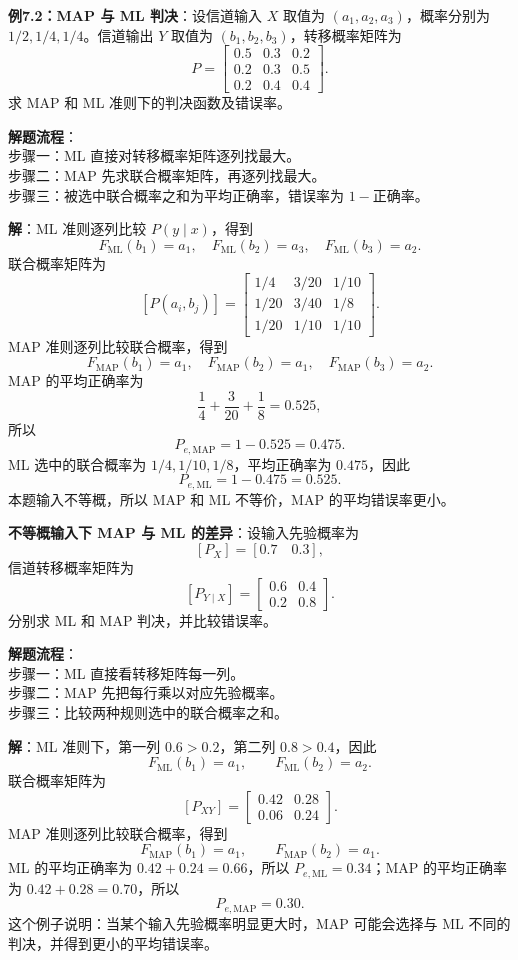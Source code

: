 \begin{example}
\label{ex:ch7-map-ml-decision}
\textbf{例7.2：MAP 与 ML 判决}：设信道输入 $X$ 取值为 $(a_1,a_2,a_3)$，概率分别为 $1/2,1/4,1/4$。信道输出 $Y$ 取值为 $(b_1,b_2,b_3)$，转移概率矩阵为
\[
P=
\begin{bmatrix}
0.5&0.3&0.2\\
0.2&0.3&0.5\\
0.2&0.4&0.4
\end{bmatrix}.
\]
求 MAP 和 ML 准则下的判决函数及错误率。

\noindent \textbf{解题流程}：\\[2pt]
步骤一：ML 直接对转移概率矩阵逐列找最大。\\
步骤二：MAP 先求联合概率矩阵，再逐列找最大。\\
步骤三：被选中联合概率之和为平均正确率，错误率为 $1-$正确率。

\textbf{解}：ML 准则逐列比较 $P(y\mid x)$，得到
\[
F_{\mathrm{ML}}(b_1)=a_1,
\quad
F_{\mathrm{ML}}(b_2)=a_3,
\quad
F_{\mathrm{ML}}(b_3)=a_2.
\]
联合概率矩阵为
\[
[P(a_i,b_j)]=
\begin{bmatrix}
1/4&3/20&1/10\\
1/20&3/40&1/8\\
1/20&1/10&1/10
\end{bmatrix}.
\]
MAP 准则逐列比较联合概率，得到
\[
F_{\mathrm{MAP}}(b_1)=a_1,
\quad
F_{\mathrm{MAP}}(b_2)=a_1,
\quad
F_{\mathrm{MAP}}(b_3)=a_2.
\]
MAP 的平均正确率为
\[
\frac14+\frac3{20}+\frac18=0.525,
\]
所以
\[
P_{e,\mathrm{MAP}}=1-0.525=0.475.
\]
ML 选中的联合概率为 $1/4,1/10,1/8$，平均正确率为 $0.475$，因此
\[
P_{e,\mathrm{ML}}=1-0.475=0.525.
\]
本题输入不等概，所以 MAP 和 ML 不等价，MAP 的平均错误率更小。
\end{example}

\begin{example}
\label{ex:ch7-nonuniform-map-ml}
\textbf{不等概输入下 MAP 与 ML 的差异}：设输入先验概率为
\[
[P_X]=[0.7\quad0.3],
\]
信道转移概率矩阵为
\[
[P_{Y\mid X}]=
\begin{bmatrix}
0.6&0.4\\
0.2&0.8
\end{bmatrix}.
\]
分别求 ML 和 MAP 判决，并比较错误率。

\noindent \textbf{解题流程}：\\[2pt]
步骤一：ML 直接看转移矩阵每一列。\\
步骤二：MAP 先把每行乘以对应先验概率。\\
步骤三：比较两种规则选中的联合概率之和。

\textbf{解}：ML 准则下，第一列 $0.6>0.2$，第二列 $0.8>0.4$，因此
\[
F_{\mathrm{ML}}(b_1)=a_1,
\qquad
F_{\mathrm{ML}}(b_2)=a_2.
\]
联合概率矩阵为
\[
[P_{XY}]=
\begin{bmatrix}
0.42&0.28\\
0.06&0.24
\end{bmatrix}.
\]
MAP 准则逐列比较联合概率，得到
\[
F_{\mathrm{MAP}}(b_1)=a_1,
\qquad
F_{\mathrm{MAP}}(b_2)=a_1.
\]
ML 的平均正确率为 $0.42+0.24=0.66$，所以 $P_{e,\mathrm{ML}}=0.34$；MAP 的平均正确率为 $0.42+0.28=0.70$，所以
\[
P_{e,\mathrm{MAP}}=0.30.
\]
这个例子说明：当某个输入先验概率明显更大时，MAP 可能会选择与 ML 不同的判决，并得到更小的平均错误率。
\end{example}

